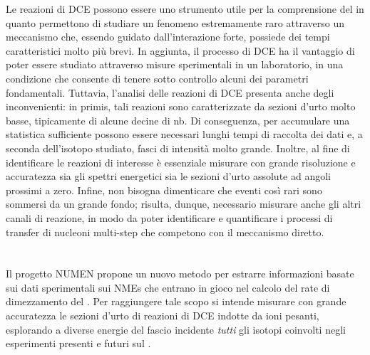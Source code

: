 Le reazioni di DCE possono essere uno strumento utile per la comprensione del \doppiobeta{} in quanto permettono di studiare un fenomeno estremamente raro attraverso un meccanismo che, essendo guidato dall'interazione forte, possiede dei tempi caratteristici molto più brevi. 
In aggiunta, il processo di DCE ha il vantaggio di poter essere studiato attraverso misure sperimentali in un laboratorio, in una condizione che consente di tenere sotto controllo alcuni dei parametri fondamentali.
Tuttavia, l'analisi delle reazioni di DCE presenta anche degli inconvenienti: in primis, tali reazioni sono caratterizzate da sezioni d'urto molto basse, tipicamente di alcune decine di nb.
Di conseguenza, per accumulare una statistica sufficiente possono essere necessari lunghi tempi di raccolta dei dati e, a seconda dell'isotopo studiato, fasci di intensità molto grande.
Inoltre, al fine di identificare le reazioni di interesse è essenziale misurare con grande risoluzione e accuratezza sia gli spettri energetici sia le sezioni d'urto assolute ad angoli prossimi a zero. 
Infine, non bisogna dimenticare che eventi così rari sono sommersi da un grande fondo; risulta, dunque, necessario misurare anche gli altri canali di reazione, in modo da poter identificare e quantificare i processi di transfer di nucleoni multi-step che competono con il meccanismo diretto.




\section{} \label{sez:progetto_numen}

Il progetto NUMEN propone un nuovo metodo per estrarre informazioni basate sui dati sperimentali sui NMEs che entrano in gioco nel calcolo del rate di dimezzamento del \doppiobeta{}. 
Per raggiungere tale scopo si intende misurare con grande accuratezza le sezioni d'urto di reazioni di DCE indotte da ioni pesanti, esplorando a diverse energie del fascio incidente \emph{tutti} gli isotopi coinvolti negli esperimenti presenti e futuri sul \doppiobeta{}.

